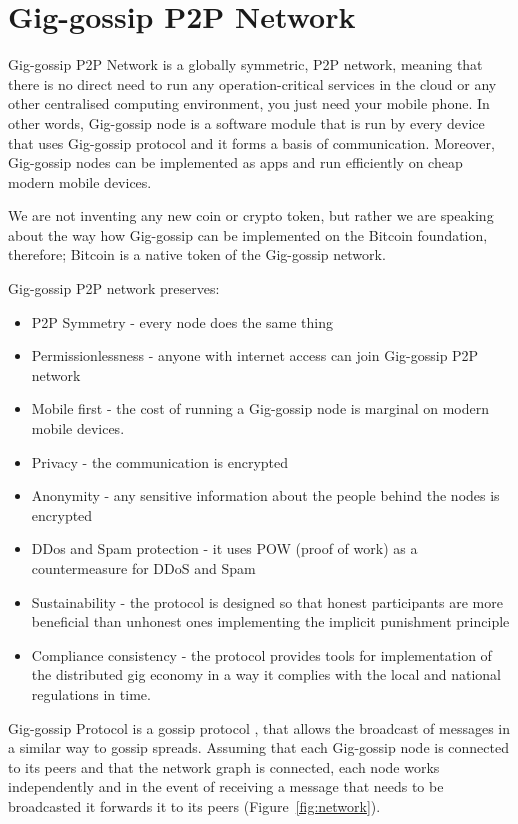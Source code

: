 \documentclass{article}
\begin{document}
\section{Gig-gossip P2P Network}
Gig-gossip P2P Network is a globally symmetric, P2P network, meaning that there is no direct need to run any operation-critical services in the cloud or any other centralised computing environment, you just need your mobile phone. In other words, Gig-gossip node is a software module that is run by every device that uses Gig-gossip protocol and it forms a basis of communication. Moreover, Gig-gossip nodes can be implemented as apps and run efficiently on cheap modern mobile devices. 

We are not inventing any new coin or crypto token, but rather we are speaking about the way how Gig-gossip can be implemented on the Bitcoin foundation, therefore; Bitcoin is a native token of the Gig-gossip network.

Gig-gossip P2P network preserves:
\begin{itemize}
\item P2P Symmetry - every node does the same thing
\item Permissionlessness - anyone with internet access can join Gig-gossip P2P network
\item Mobile first - the cost of running a Gig-gossip node is marginal on modern mobile devices. 
\item Privacy - the communication is encrypted
\item Anonymity - any sensitive information about the people behind the nodes is encrypted
\item DDos and Spam protection - it uses POW (proof of work) as a countermeasure for DDoS and Spam
\item Sustainability - the protocol is designed so that honest participants are more beneficial than unhonest ones implementing the implicit punishment principle
\item Compliance consistency - the protocol provides tools for implementation of the distributed gig economy in a way it complies with the local and national regulations in time.
\end{itemize}

Gig-gossip Protocol is a gossip protocol \cite{Fanout}, that allows the broadcast of messages in a similar way to gossip spreads. Assuming that each Gig-gossip node is connected to its peers and that the network graph is connected, each node works independently and in the event of receiving a message that needs to be broadcasted it forwards it to its peers (Figure~\ref{fig:network}). 
\end{document}
